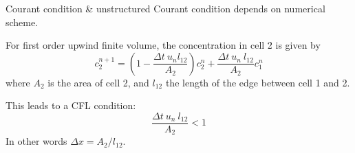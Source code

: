 \documentclass[12pt]{beamer}
\begin{document}
\begin{frame}{Courant condition \& unstructured}
  Courant condition depends on numerical scheme.
  \begin{example}
    \small
    \begin{minipage}{0.7\textwidth}
    For first order upwind finite volume, the concentration in cell 2 is given
    by
    \begin{equation*}
      c^{n+1}_2 = \left(1-\frac{\Delta t~u_n l_{12}}{A_2}\right) c^n_2
        +\frac{\Delta t~u_n~l_{12}}{A_2} c^n_1
    \end{equation*}
    where $A_2$ is the area of cell 2, and $l_{12}$ the length of the edge
    between cell 1 and 2.

    This leads to a CFL condition:
    \begin{equation*}
        \frac{\Delta t~u_n~l_{12}}{A_2}<1
    \end{equation*}
    In other words $\Delta x=A_2/l_{12}$.
    \end{minipage}%
    \begin{minipage}{0.3\textwidth}

\end{minipage}
\end{example}
\end{frame}
\end{document}

